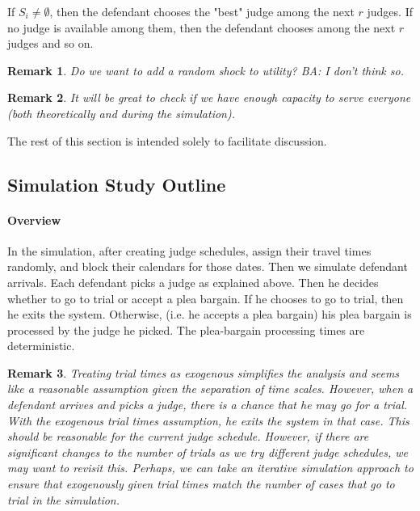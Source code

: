 \documentclass[11pt, oneside]{article}   	%
\theoremstyle{ModifiedStyle}
\newtheorem{remark}{Remark}
\begin{document}
			If $S_i \neq \emptyset$, then the defendant chooses the "best" judge among the next $r$ judges. If no judge is available among them, then the defendant chooses among the next $r$ judges and so on.

			\begin{remark}
				Do we want to add a random shock to utility? BA: I don't think so.
			\end{remark}

			\begin{remark}
				It will be great to check if we have enough capacity to serve everyone (both theoretically and during the simulation).
			\end{remark}

			The rest of this section is intended solely to facilitate discussion.

	\subsection{Simulation Study Outline}

		\paragraph{Overview} In the simulation, after creating judge schedules, assign their travel times randomly, and block their calendars for those dates. Then we simulate defendant arrivals. Each defendant picks a judge as explained above. Then he decides whether to go to trial or accept a plea bargain. If he chooses to go to trial, then he exits the system. Otherwise, (i.e. he accepts a plea bargain) his plea bargain is processed by the judge he picked. The plea-bargain processing times are deterministic.

		\begin{remark}
			Treating trial times as exogenous simplifies the analysis and seems like a reasonable assumption given the separation of time scales. However, when a defendant arrives and picks a judge, there is a chance that he may go for a trial. With the exogenous trial times assumption, he exits the system in that case. This should be reasonable for the current judge schedule. However, if there are significant changes to the number of trials as we try different judge schedules, we may want to revisit this. Perhaps, we can take an iterative simulation approach to ensure that exogenously given trial times match the number of cases that go to trial in the simulation.
		\end{remark}
\end{document}
